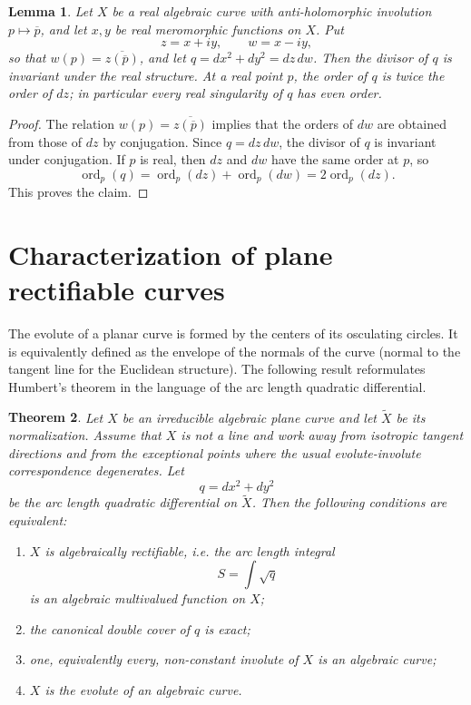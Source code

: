 \documentclass[reqno]{amsart}
\newtheorem{theorem}{Theorem}
\newtheorem{lemma}[theorem]{Lemma}
\theoremstyle{definition}
\theoremstyle{remark}
\theoremstyle{definition}
\theoremstyle{definition}
\theoremstyle{definition}
\begin{document}
\begin{lemma}\label{lem:real-singularities-even}
Let $X$ be a real algebraic curve with anti-holomorphic involution $p\mapsto\overline p$, and let $x,y$ be real meromorphic functions on $X$. Put
\[
 z=x+iy,\qquad w=x-iy,
\]
so that $w(p)=\overline{z(\overline p)}$, and let $q=dx^2+dy^2=dz\,dw$. Then the divisor of $q$ is invariant under the real structure. At a real point $p$, the order of $q$ is twice the order of $dz$; in particular every real singularity of $q$ has even order.
\end{lemma}

\begin{proof}
The relation $w(p)=\overline{z(\overline p)}$ implies that the orders of $dw$ are obtained from those of $dz$ by conjugation. Since $q=dz\,dw$, the divisor of $q$ is invariant under conjugation. If $p$ is real, then $dz$ and $dw$ have the same order at $p$, so
\[
 \operatorname{ord}_{p}(q)=\operatorname{ord}_{p}(dz)+\operatorname{ord}_{p}(dw)=2\operatorname{ord}_{p}(dz).
\]
This proves the claim.
\end{proof}

\section{Characterization of plane rectifiable curves}\label{sec:main}


The evolute of a planar curve is formed by the centers of its osculating circles. It is equivalently defined as the envelope of the normals of the curve (normal to the tangent line for the Euclidean structure).  The following result reformulates Humbert's theorem in the language of
the arc length quadratic differential.

\begin{theorem}\label{thm:involutes-exact}
Let $X$ be an irreducible algebraic plane curve and let
$\widetilde X$ be its normalization. Assume that $X$ is not a line
and work away from isotropic tangent directions and from the exceptional
points where the usual evolute-involute correspondence degenerates. Let
\[
q=dx^2+dy^2
\]
be the arc length quadratic differential on $\widetilde X$. Then the
following conditions are equivalent:
\begin{enumerate}
\item $X$ is algebraically rectifiable, i.e. the arc length integral
\[
S=\int \sqrt{q}
\]
is an algebraic multivalued function on $X$;
\item the canonical double cover of $q$ is exact;
\item one, equivalently every, non-constant involute of $X$ is an
algebraic curve;
\item $X$ is the evolute of an algebraic curve.
\end{enumerate}
\end{theorem}
\end{document}
